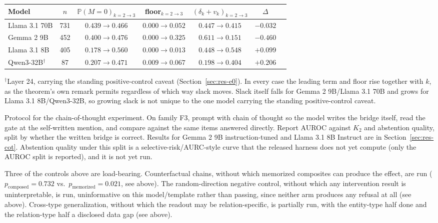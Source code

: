 \documentclass{article}
\begin{document}
\begin{center}
\small
{}
\label{tab:compound-allmodels}
\vspace{1pt}
\begin{tabular}{@{}lcccccc@{}}
\toprule
\textbf{Model} & $n$ & $\mathbb{P}(M{=}0)_{k=2\to3}$ & \textbf{floor}$_{k=2\to3}$ & $(\delta_k{+}v_k)_{k=2\to3}$ & $\Delta$\\
\midrule
Llama 3.1 70B & 731 & $0.439\to0.466$ & $0.000\to0.052$ & $0.447\to0.415$ & $-0.032$\\
Gemma 2 9B    & 452 & $0.400\to0.476$ & $0.000\to0.325$ & $0.611\to0.151$ & $-0.460$\\
Llama 3.1 8B  & 405 & $0.178\to0.560$ & $0.000\to0.013$ & $0.448\to0.548$ & $+0.099$\\
Qwen3-32B$^\dagger$ & 87 & $0.207\to0.471$ & $0.009\to0.067$ & $0.198\to0.404$ & $+0.206$\\
\bottomrule
\end{tabular}

\vspace{2pt}
{\footnotesize $^\dagger$Layer 24, carrying the standing positive-control caveat
(Section~\ref{sec:res-e0}). In every case the leading term and floor rise together with $k$, as the
theorem's own remark permits regardless of which way slack moves. Slack itself falls for Gemma 2
9B/Llama 3.1 70B and grows for Llama 3.1 8B/Qwen3-32B, so growing slack is not unique to the one
model carrying the standing positive-control caveat.}
\end{center}

Protocol for the chain-of-thought experiment. On family F3, prompt with chain of thought so the model
writes the bridge itself, read the
gate at the self-written mention, and compare against the same items answered directly. Report AUROC
against $K_2$ and abstention quality, split by whether the written bridge is correct. Results for
Gemma 2 9B instruction-tuned and Llama 3.1 8B Instruct are in Section~\ref{sec:res-cot}. Abstention
quality under this split is a selective-risk/AURC-style curve that the released harness does not yet
compute (only the AUROC split is reported), and it is not yet run.

Three of the controls above are load-bearing. Counterfactual chains, without which memorized
composites can produce the effect, are run ($p_{\mathrm{composed}}=0.732$ vs.\ $p_{\mathrm{memorized}}=0.021$,
see above). The
random-direction negative control, without which any intervention result is uninterpretable, is run,
uninformative on this model/template rather than passing, since neither arm produces any refusal at
all (see above). Cross-type generalization, without which the readout may be relation-specific, is
partially run, with the entity-type half done and the relation-type half a disclosed data gap (see
above).
\end{document}

